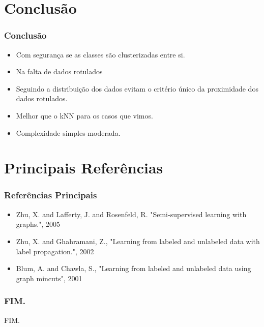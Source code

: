 \documentclass{beamer}
\begin{document}
  \section{Conclusão}
    \frame
    {
      \frametitle{Conclusão}
      \begin{itemize}
        \item Com segurança se as classes são clusterizadas entre si. 
        \item Na falta de dados rotulados
        \item Seguindo a distribuição dos dados evitam o critério único da proximidade dos dados rotulados.
        \item Melhor que o kNN para os casos que vimos.
        \item Complexidade simples-moderada.
      \end{itemize}
    }

    \section{Principais Referências}
    \frame
    {
      \frametitle{Referências Principais}
      \begin{itemize}
        \item Zhu, X. and Lafferty, J. and Rosenfeld, R. "Semi-supervised learning with graphs.", 2005
        \item Zhu, X. and Ghahramani, Z., "Learning from labeled and unlabeled data with label propagation.", 2002
        \item Blum, A. and Chawla, S., "Learning from labeled and unlabeled data using graph mincuts", 2001
      \end{itemize}
    }

    \frame
    {
      \frametitle{FIM.}

        FIM.

    }
\end{document}
